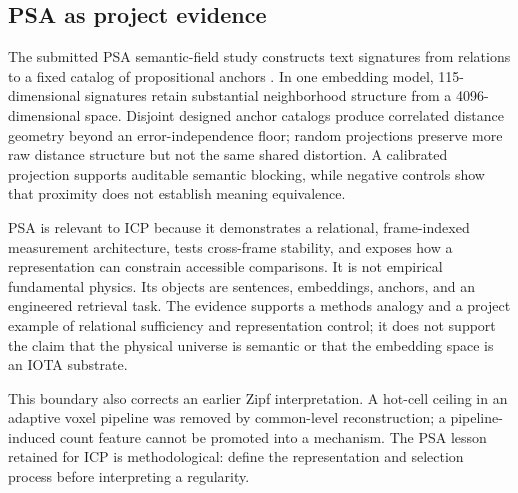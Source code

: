 \subsection{PSA as project evidence}

The submitted PSA semantic-field study constructs text signatures from
relations to a fixed catalog of propositional anchors
\citep{Clark2026PSA}. In one embedding model, 115-dimensional signatures retain
substantial neighborhood structure from a 4096-dimensional space. Disjoint
designed anchor catalogs produce correlated distance geometry beyond an
error-independence floor; random projections preserve more raw distance
structure but not the same shared distortion. A calibrated projection supports
auditable semantic blocking, while negative controls show that proximity does
not establish meaning equivalence.

PSA is relevant to ICP because it demonstrates a relational, frame-indexed
measurement architecture, tests cross-frame stability, and exposes how a
representation can constrain accessible comparisons. It is not empirical
fundamental physics. Its objects are sentences, embeddings, anchors, and an
engineered retrieval task. The evidence supports a methods analogy and a
project example of relational sufficiency and representation control; it does
not support the claim that the physical universe is semantic or that the
embedding space is an IOTA substrate.

This boundary also corrects an earlier Zipf interpretation. A hot-cell ceiling
in an adaptive voxel pipeline was removed by common-level reconstruction; a
pipeline-induced count feature cannot be promoted into a mechanism. The PSA
lesson retained for ICP is methodological: define the representation and
selection process before interpreting a regularity.
